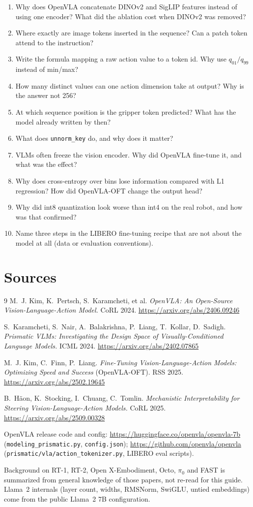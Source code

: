 \documentclass[11pt]{article}
\begin{document}
\begin{enumerate}
  \item Why does OpenVLA concatenate DINOv2 and SigLIP features instead of using one encoder? What did the ablation cost when DINOv2 was removed?
  \item Where exactly are image tokens inserted in the sequence? Can a patch token attend to the instruction?
  \item Write the formula mapping a raw action value to a token id. Why use $q_{01}/q_{99}$ instead of min/max?
  \item How many distinct values can one action dimension take at output? Why is the answer not 256?
  \item At which sequence position is the gripper token predicted? What has the model already written by then?
  \item What does \texttt{unnorm\_key} do, and why does it matter?
  \item VLMs often freeze the vision encoder. Why did OpenVLA fine-tune it, and what was the effect?
  \item Why does cross-entropy over bins lose information compared with L1 regression? How did OpenVLA-OFT change the output head?
  \item Why did int8 quantization look worse than int4 on the real robot, and how was that confirmed?
  \item Name three steps in the LIBERO fine-tuning recipe that are not about the model at all (data or evaluation conventions).
\end{enumerate}

\section{Sources}
\label{sec:sources}

\begin{thebibliography}{9}
 M.~J. Kim, K.~Pertsch, S.~Karamcheti, et al.
\emph{OpenVLA: An Open-Source Vision-Language-Action Model.} CoRL 2024. \url{https://arxiv.org/abs/2406.09246}

 S.~Karamcheti, S.~Nair, A.~Balakrishna, P.~Liang, T.~Kollar, D.~Sadigh.
\emph{Prismatic VLMs: Investigating the Design Space of Visually-Conditioned Language Models.} ICML 2024. \url{https://arxiv.org/abs/2402.07865}

 M.~J. Kim, C.~Finn, P.~Liang.
\emph{Fine-Tuning Vision-Language-Action Models: Optimizing Speed and Success} (OpenVLA-OFT). RSS 2025. \url{https://arxiv.org/abs/2502.19645}

 B.~Häon, K.~Stocking, I.~Chuang, C.~Tomlin.
\emph{Mechanistic Interpretability for Steering Vision-Language-Action Models.} CoRL 2025. \url{https://arxiv.org/abs/2509.00328}

 OpenVLA release code and config: \url{https://huggingface.co/openvla/openvla-7b} (\texttt{modeling\_prismatic.py}, \texttt{config.json}); \url{https://github.com/openvla/openvla} (\texttt{prismatic/vla/action\_tokenizer.py}, LIBERO eval scripts).
\end{thebibliography}

\noindent\small Background on RT-1, RT-2, Open X-Embodiment, Octo, $\pi_0$ and FAST is summarized from general knowledge of those papers, not re-read for this guide. Llama~2 internals (layer count, widths, RMSNorm, SwiGLU, untied embeddings) come from the public Llama~2 7B configuration.
\end{document}
